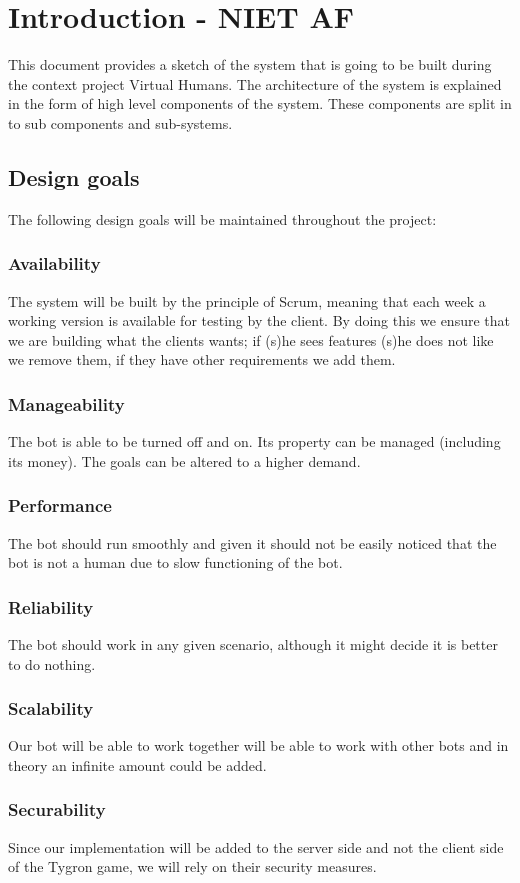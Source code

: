 \section{Introduction - NIET AF}

This document provides a sketch of the system that is going to be built during the context project Virtual Humans. The architecture of the system is explained in the form of high level components of the system. These components are split in to sub components and sub-systems.

\subsection{Design goals}
The following design goals will be maintained throughout the project:

\subsubsection{Availability}
The system will be built by the principle of Scrum, meaning that each week a working version is available for testing by the client. By doing this we ensure that we are building what the clients wants; if (s)he sees features (s)he does not like we remove them, if they have other requirements we add them. 

\subsubsection{Manageability}
The bot is able to be turned off and on. Its property can be managed (including its money). The goals can be altered to a higher demand.

\subsubsection{Performance}
The bot should run smoothly and given it should not be easily noticed that the bot is not a human due to slow functioning of the bot.

\subsubsection{Reliability}
The bot should work in any given scenario, although it might decide it is better to do nothing.

\subsubsection{Scalability}
Our bot will be able to work together will be able to work with other bots and in theory an infinite amount could be added.

\subsubsection{Securability}
Since our implementation will be added to the server side and not the client side of the Tygron game, we will rely on their security measures.

\newpage